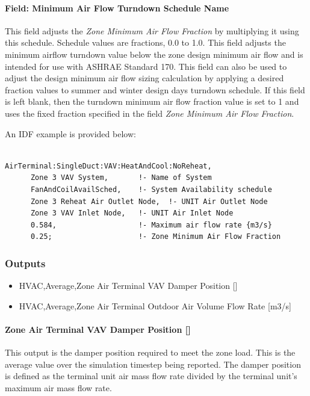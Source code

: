 \paragraph{Field: Minimum Air Flow Turndown Schedule Name}

This field adjusts the \textit{Zone Minimum Air Flow Fraction} by multiplying it using this schedule. Schedule values are fractions, 0.0 to 1.0. This field adjusts the minimum airflow turndown value below the zone design minimum air flow and is intended for use with ASHRAE Standard 170. This field can also be used to adjust the design minimum air flow sizing calculation by applying a desired fraction values to summer and winter design days turndown schedule. If this field is left blank, then the turndown minimum air flow fraction value is set to 1 and uses the fixed fraction specified in the field \textit{Zone Minimum Air Flow Fraction}.

An IDF example is provided below:

\begin{lstlisting}

AirTerminal:SingleDuct:VAV:HeatAndCool:NoReheat,
      Zone 3 VAV System,       !- Name of System
      FanAndCoilAvailSched,    !- System Availability schedule
      Zone 3 Reheat Air Outlet Node,  !- UNIT Air Outlet Node
      Zone 3 VAV Inlet Node,   !- UNIT Air Inlet Node
      0.584,                   !- Maximum air flow rate {m3/s}
      0.25;                    !- Zone Minimum Air Flow Fraction
\end{lstlisting}

\subsubsection{Outputs}\label{outputs-6}

\begin{itemize}
\item
  HVAC,Average,Zone Air Terminal VAV Damper Position {[]}
\item
  HVAC,Average,Zone Air Terminal Outdoor Air Volume Flow Rate {[}m3/s{]}
\end{itemize}

\paragraph{Zone Air Terminal VAV Damper Position {[]}}\label{zone-air-terminal-vav-damper-position-4}

This output is the damper position required to meet the zone load. This is the average value over the simulation timestep being reported. The damper position is defined as the terminal unit air mass flow rate divided by the terminal unit's maximum air mass flow rate.

